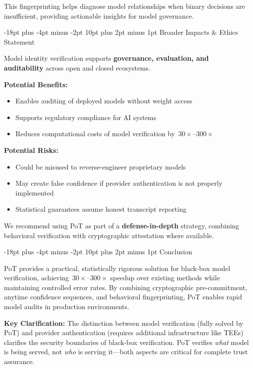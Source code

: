 \documentclass[11pt]{article}
\makeatletter
\renewcommand\section{\@startsection{section}{1}{\z@}%
  {-18pt plus -4pt minus -2pt}%
  {10pt plus 2pt minus 1pt}%
  {\normalfont\Large\bfseries}}
\makeatother
\begin{document}
This fingerprinting helps diagnose model relationships when binary decisions are insufficient, providing actionable insights for model governance.

\section{Broader Impacts \& Ethics Statement}

Model identity verification supports \textbf{governance, evaluation, and auditability} across open and closed ecosystems.

\textbf{Potential Benefits:}
\begin{itemize}
\item Enables auditing of deployed models without weight access
\item Supports regulatory compliance for AI systems
\item Reduces computational costs of model verification by~$30{\times}$--$300{\times}$
\end{itemize}

\textbf{Potential Risks:}
\begin{itemize}
\item Could be misused to reverse-engineer proprietary models
\item May create false confidence if provider authentication is not properly implemented
\item Statistical guarantees assume honest transcript reporting
\end{itemize}

We recommend using PoT as part of a \textbf{defense-in-depth} strategy, combining behavioral verification with cryptographic attestation where available.

\section{Conclusion}

PoT provides a practical, statistically rigorous solution for black-box model verification, achieving~$30{\times}$--$300{\times}$ speedup over existing methods while maintaining controlled error rates. By combining cryptographic pre-commitment, anytime confidence sequences, and behavioral fingerprinting, PoT enables rapid model audits in production environments. 

\textbf{Key Clarification:} The distinction between model verification (fully solved by PoT) and provider authentication (requires additional infrastructure like TEEs) clarifies the security boundaries of black-box verification. PoT verifies \emph{what} model is being served, not \emph{who} is serving it---both aspects are critical for complete trust assurance.
\end{document}
